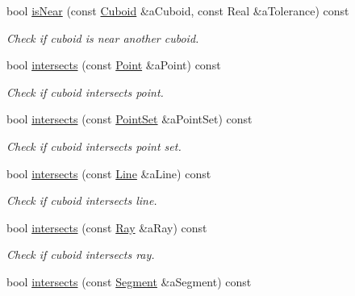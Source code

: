 \begin{DoxyCompactItemize}
bool \hyperlink{classostk_1_1math_1_1geom_1_1d3_1_1objects_1_1_cuboid_a4e4bcebf83464e2f946346d606c5f44c}{is\+Near} (const \hyperlink{classostk_1_1math_1_1geom_1_1d3_1_1objects_1_1_cuboid}{Cuboid} \&a\+Cuboid, const Real \&a\+Tolerance) const
\begin{DoxyCompactList}\small\item\em Check if cuboid is near another cuboid. \end{DoxyCompactList}\item 
bool \hyperlink{classostk_1_1math_1_1geom_1_1d3_1_1objects_1_1_cuboid_ae3bd1daf3311571b020da901f24d1a41}{intersects} (const \hyperlink{classostk_1_1math_1_1geom_1_1d3_1_1objects_1_1_point}{Point} \&a\+Point) const
\begin{DoxyCompactList}\small\item\em Check if cuboid intersects point. \end{DoxyCompactList}\item 
bool \hyperlink{classostk_1_1math_1_1geom_1_1d3_1_1objects_1_1_cuboid_aa922a6ee7f3fe7cbbbfe584fa0d86e2c}{intersects} (const \hyperlink{classostk_1_1math_1_1geom_1_1d3_1_1objects_1_1_point_set}{Point\+Set} \&a\+Point\+Set) const
\begin{DoxyCompactList}\small\item\em Check if cuboid intersects point set. \end{DoxyCompactList}\item 
bool \hyperlink{classostk_1_1math_1_1geom_1_1d3_1_1objects_1_1_cuboid_a4a9e6493bb2339591bceb908e0b561d1}{intersects} (const \hyperlink{classostk_1_1math_1_1geom_1_1d3_1_1objects_1_1_line}{Line} \&a\+Line) const
\begin{DoxyCompactList}\small\item\em Check if cuboid intersects line. \end{DoxyCompactList}\item 
bool \hyperlink{classostk_1_1math_1_1geom_1_1d3_1_1objects_1_1_cuboid_adfa6039ef6cf8e800af4927ababbc34f}{intersects} (const \hyperlink{classostk_1_1math_1_1geom_1_1d3_1_1objects_1_1_ray}{Ray} \&a\+Ray) const
\begin{DoxyCompactList}\small\item\em Check if cuboid intersects ray. \end{DoxyCompactList}\item 
bool \hyperlink{classostk_1_1math_1_1geom_1_1d3_1_1objects_1_1_cuboid_a7651ffba557857db7169304e0b07793c}{intersects} (const \hyperlink{classostk_1_1math_1_1geom_1_1d3_1_1objects_1_1_segment}{Segment} \&a\+Segment) const

\end{DoxyCompactItemize}
